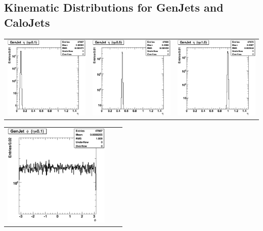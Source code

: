 \documentclass{cmspaper}
\begin{document}
\begin{appendices}

\section{Kinematic Distributions for GenJets and CaloJets}
\label{app:kin_dist}

\begin{center}
 \begin{tabular}{lll}
  \includegraphics[width=2in]{figs/h_GenJetEta_corr_eta0.1.eps} &
  \includegraphics[width=2in]{figs/h_GenJetEta_corr_eta0.5.eps} &
  \includegraphics[width=2in]{figs/h_GenJetEta_corr_eta1.0.eps} \\
 \end{tabular}
\end{center}
\begin{center}
 \begin{tabular}{lll}
  \includegraphics[width=2in]{figs/h_GenJetPhi_corr_eta0.1.eps} &

\end{tabular}
\end{center}
\end{appendices}
\end{document}
